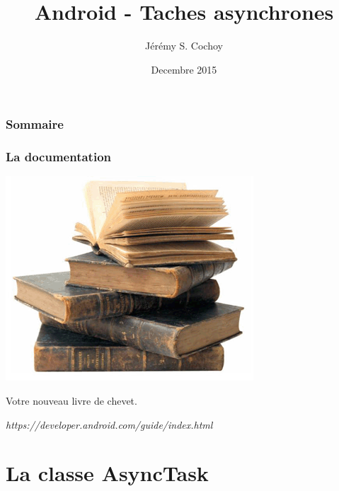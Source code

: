 \documentclass{beamer}
\begin{document}
\title{Android - Taches asynchrones}
\author{Jérémy S. Cochoy}
\date{Decembre 2015}


\begin{frame}
\titlepage
\end{frame}

\begin{frame}
\frametitle{Sommaire}
\tableofcontents
\end{frame}

\begin{frame}
\frametitle{La documentation}
\begin{center}
\includegraphics[scale=0.5]{livres.png}
\end{center}
\begin{block}{Votre nouveau livre de chevet.}
\begin{center}
\emph{https://developer.android.com/guide/index.html}
\end{center}
\end{block}

\end{frame}

\section{La classe AsyncTask}
\end{document}
